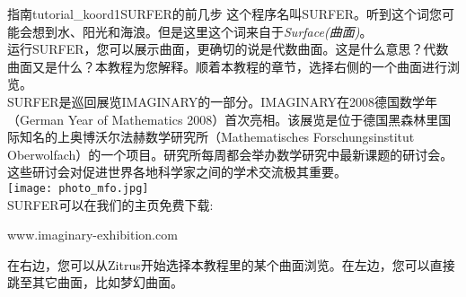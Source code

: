﻿\begin{surferIntroPage}{指南}{tutorial_koord1}{SURFER的前几步}
这个程序名叫SURFER。听到这个词您可能会想到水、阳光和海浪。但是这里这个词来自于\textit{Surface(曲面)}。
\\

运行SURFER，您可以展示曲面，更确切的说是代数曲面。这是什么意思？代数曲面又是什么？本教程为您解释。顺着本教程的章节，选择右侧的一个曲面进行浏览。\\
SURFER是巡回展览IMAGINARY的一部分。IMAGINARY在2008德国数学年（German Year of Mathematics 2008）首次亮相。该展览是位于德国黑森林里国际知名的上奥博沃尔法赫数学研究所（Mathematisches Forschungsinstitut Oberwolfach）的一个项目。研究所每周都会举办数学研究中最新课题的研讨会。这些研讨会对促进世界各地科学家之间的学术交流极其重要。\\
\vspace{0.2cm} \hspace{3.5cm}\texttt{[image: photo\_mfo.jpg]}\\
SURFER可以在我们的主页免费下载: \\
\begin{centering}
www.imaginary-exhibition.com\\
\end{centering}
 \vspace{0.2cm}
在右边，您可以从Zitrus开始选择本教程里的某个曲面浏览。在左边，您可以直接跳至其它曲面，比如梦幻曲面。
\end{surferIntroPage}
